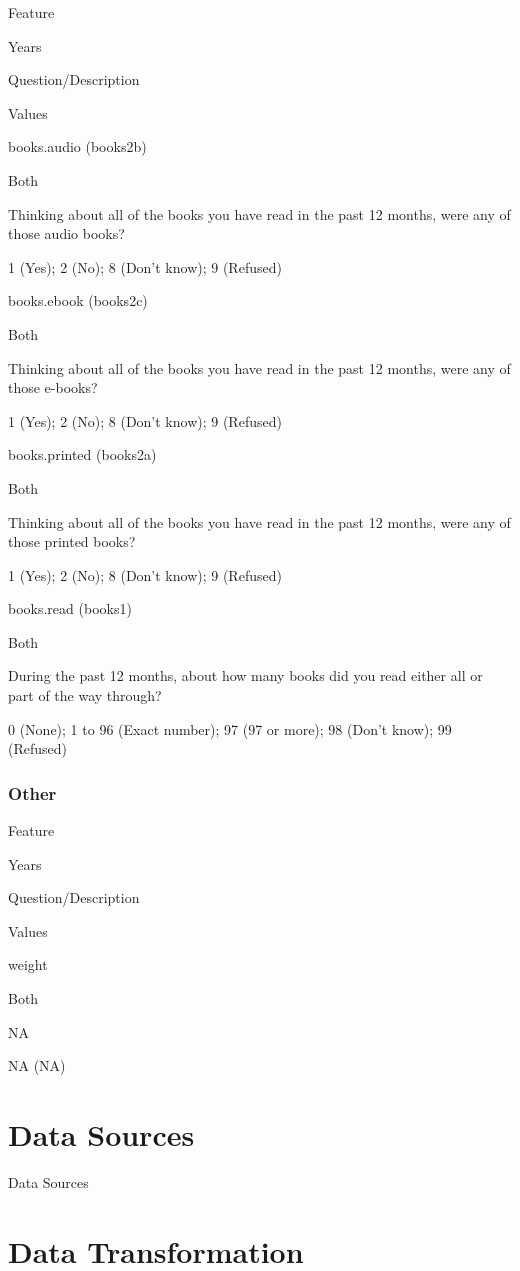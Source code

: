 \documentclass[]{book}
\begin{document}
Feature

Years

Question/Description

Values

books.audio (books2b)

Both

Thinking about all of the books you have read in the past 12 months,
were any of those audio books?

1 (Yes); 2 (No); 8 (Don't know); 9 (Refused)

books.ebook (books2c)

Both

Thinking about all of the books you have read in the past 12 months,
were any of those e-books?

1 (Yes); 2 (No); 8 (Don't know); 9 (Refused)

books.printed (books2a)

Both

Thinking about all of the books you have read in the past 12 months,
were any of those printed books?

1 (Yes); 2 (No); 8 (Don't know); 9 (Refused)

books.read (books1)

Both

During the past 12 months, about how many books did you read either all
or part of the way through?

0 (None); 1 to 96 (Exact number); 97 (97 or more); 98 (Don't know); 99
(Refused)

\subsection*{Other}\label{other}

Feature

Years

Question/Description

Values

weight

Both

NA

NA (NA)

\chapter{Data Sources}\label{data-sources}

Data Sources

\chapter{Data Transformation}\label{data-transformation}
\end{document}
